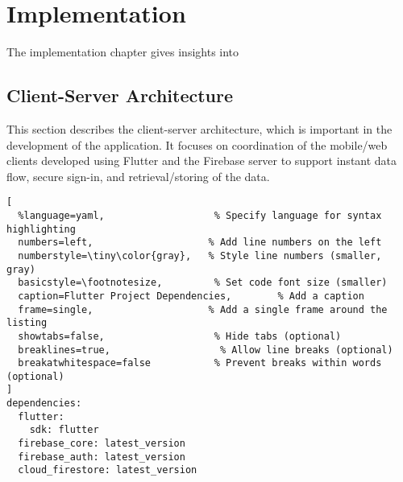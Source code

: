 
\chapter{Implementation}\label{chap:devel}

The implementation chapter gives insights into 

\section{Client-Server Architecture}

This section describes the client-server architecture, which is important in the development of the application. It focuses on coordination of the mobile/web clients developed using Flutter and the Firebase server to support instant data flow, secure sign-in, and retrieval/storing of the data.

\begin{lstlisting}[
  %language=yaml,                   % Specify language for syntax highlighting
  numbers=left,                    % Add line numbers on the left
  numberstyle=\tiny\color{gray},   % Style line numbers (smaller, gray)
  basicstyle=\footnotesize,         % Set code font size (smaller)
  caption=Flutter Project Dependencies,        % Add a caption
  frame=single,                    % Add a single frame around the listing
  showtabs=false,                   % Hide tabs (optional)
  breaklines=true,                   % Allow line breaks (optional)
  breakatwhitespace=false           % Prevent breaks within words (optional)
]
dependencies:
  flutter:
    sdk: flutter
  firebase_core: latest_version
  firebase_auth: latest_version
  cloud_firestore: latest_version
\end{lstlisting}
